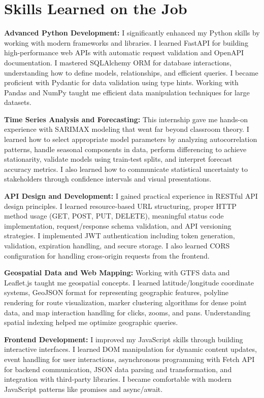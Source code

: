 \documentclass[12pt,letterpaper]{article}
\begin{document}
\section{Skills Learned on the Job}

\textbf{Advanced Python Development:} I significantly enhanced my Python skills by working with modern frameworks and libraries. I learned FastAPI for building high-performance web APIs with automatic request validation and OpenAPI documentation. I mastered SQLAlchemy ORM for database interactions, understanding how to define models, relationships, and efficient queries. I became proficient with Pydantic for data validation using type hints. Working with Pandas and NumPy taught me efficient data manipulation techniques for large datasets.

\textbf{Time Series Analysis and Forecasting:} This internship gave me hands-on experience with SARIMAX modeling that went far beyond classroom theory. I learned how to select appropriate model parameters by analyzing autocorrelation patterns, handle seasonal components in data, perform differencing to achieve stationarity, validate models using train-test splits, and interpret forecast accuracy metrics. I also learned how to communicate statistical uncertainty to stakeholders through confidence intervals and visual presentations.

\textbf{API Design and Development:} I gained practical experience in RESTful API design principles. I learned resource-based URL structuring, proper HTTP method usage (GET, POST, PUT, DELETE), meaningful status code implementation, request/response schema validation, and API versioning strategies. I implemented JWT authentication including token generation, validation, expiration handling, and secure storage. I also learned CORS configuration for handling cross-origin requests from the frontend.

\textbf{Geospatial Data and Web Mapping:} Working with GTFS data and Leaflet.js taught me geospatial concepts. I learned latitude/longitude coordinate systems, GeoJSON format for representing geographic features, polyline rendering for route visualization, marker clustering algorithms for dense point data, and map interaction handling for clicks, zooms, and pans. Understanding spatial indexing helped me optimize geographic queries.

\textbf{Frontend Development:} I improved my JavaScript skills through building interactive interfaces. I learned DOM manipulation for dynamic content updates, event handling for user interactions, asynchronous programming with Fetch API for backend communication, JSON data parsing and transformation, and integration with third-party libraries. I became comfortable with modern JavaScript patterns like promises and async/await.
\end{document}
